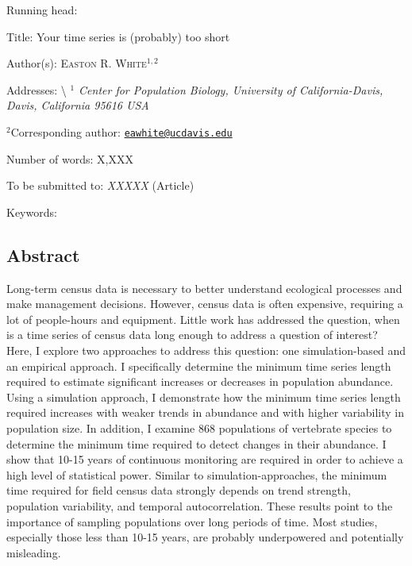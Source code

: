 \documentclass[12pt,]{article}
\title{}
\author{}
\date{}
\begin{document}
Running head: \vspace{3 mm}

Title: Your time series is (probably) too short \vspace{7 mm}

Author(s): \textsc{Easton R. White$^{1,2}$} \vspace{3 mm}

Addresses: \textbackslash{}
\emph{$^1$ Center for Population Biology, University of California-Davis, Davis, California 95616 USA}
\vspace{3 mm}

\(^2\)Corresponding author:
\href{mailto:eawhite@ucdavis.edu}{\nolinkurl{eawhite@ucdavis.edu}}
\vspace{3 mm}

Number of words: X,XXX \vspace{3 mm}

To be submitted to: \emph{XXXXX} (Article) \vspace{3 mm}

Keywords:

\vspace{3 mm}

\linenumbers

\subsection{Abstract}\label{abstract}

Long-term census data is necessary to better understand ecological
processes and make management decisions. However, census data is often
expensive, requiring a lot of people-hours and equipment. Little work
has addressed the question, when is a time series of census data long
enough to address a question of interest? Here, I explore two approaches
to address this question: one simulation-based and an empirical
approach. I specifically determine the minimum time series length
required to estimate significant increases or decreases in population
abundance. Using a simulation approach, I demonstrate how the minimum
time series length required increases with weaker trends in abundance
and with higher variability in population size. In addition, I examine
868 populations of vertebrate species to determine the minimum time
required to detect changes in their abundance. I show that 10-15 years
of continuous monitoring are required in order to achieve a high level
of statistical power. Similar to simulation-approaches, the minimum time
required for field census data strongly depends on trend strength,
population variability, and temporal autocorrelation. These results
point to the importance of sampling populations over long periods of
time. Most studies, especially those less than 10-15 years, are probably
underpowered and potentially misleading.
\end{document}
